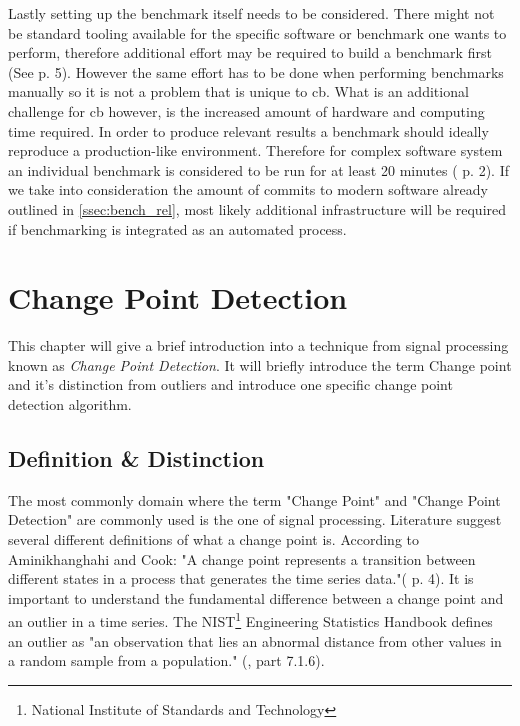 \documentclass[	runningheads,
				a4paper]{llncs}
\begin{document}
	Lastly setting up the benchmark itself needs to be considered. There might not be standard tooling available for the specific software or benchmark one wants to perform, therefore additional effort may be required to build a benchmark first (See \cite{grambow2019} p. 5). However the same effort has to be done when performing benchmarks manually so it is not a problem that is unique to \gls{cb}. What is an additional challenge for \gls{cb} however, is the increased amount of hardware and computing time required. In order to produce relevant results a benchmark should ideally reproduce a production-like environment. Therefore for complex software system an individual benchmark is considered to be run for at least 20 minutes (\cite{grambow2019} p. 2). If we take into consideration the amount of commits to modern software already outlined in \autoref{ssec:bench_rel}, most likely additional infrastructure will be required if benchmarking is integrated as an automated process. 

	\section{Change Point Detection}
	\label{sec:cp_detection}
	This chapter will give a brief introduction into a technique from signal processing known as \textit{Change Point Detection}. It will briefly introduce the term Change point and it's distinction from outliers and introduce one specific change point detection algorithm. 
	
	\subsection{Definition \& Distinction}
	\label{ssec:cp_distinction}
	The most commonly domain where the term "Change Point" and "Change Point Detection" are commonly used is the one of signal processing. Literature suggest several different definitions of what a change point is.  According to Aminikhanghahi and Cook: "A change point represents a transition between different states in a process that generates the time series data."(\cite{Samaneh2016} p. 4). It is important to understand the fundamental difference between a change point and an outlier in a time series. The NIST\footnote{National Institute of Standards and Technology} Engineering Statistics Handbook defines an outlier as "an observation that lies an abnormal distance from other values in a random sample from a population." (\cite{nist}, part 7.1.6). 
\end{document}
